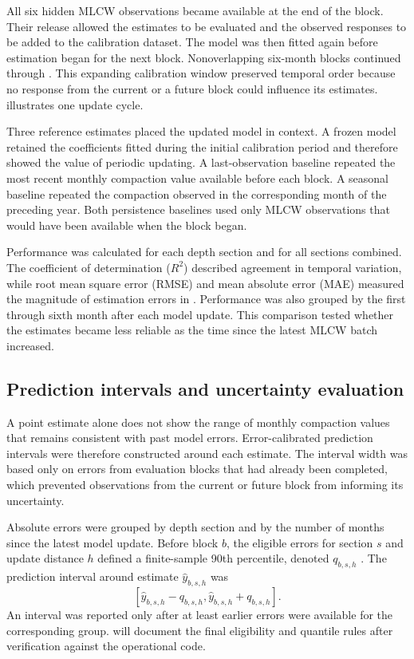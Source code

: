 All six hidden MLCW observations became available at the end of the block. Their release allowed the estimates to be evaluated and the observed responses to be added to the calibration dataset. The model was then fitted again before estimation began for the next block. Nonoverlapping six-month blocks continued through . This expanding calibration window preserved temporal order because no response from the current or a future block could influence its estimates.  illustrates one update cycle.

Three reference estimates placed the updated model in context. A frozen model retained the coefficients fitted during the initial calibration period and therefore showed the value of periodic updating. A last-observation baseline repeated the most recent monthly compaction value available before each block. A seasonal baseline repeated the compaction observed in the corresponding month of the preceding year. Both persistence baselines used only MLCW observations that would have been available when the block began.

Performance was calculated for each depth section and for all sections combined. The coefficient of determination ($R^2$) described agreement in temporal variation, while root mean square error (RMSE) and mean absolute error (MAE) measured the magnitude of estimation errors in . Performance was also grouped by the first through sixth month after each model update. This comparison tested whether the estimates became less reliable as the time since the latest MLCW batch increased.

\subsection{Prediction intervals and uncertainty evaluation}
\label{subsec:uncertainty}

A point estimate alone does not show the range of monthly compaction values that remains consistent with past model errors. Error-calibrated prediction intervals were therefore constructed around each estimate. The interval width was based only on errors from evaluation blocks that had already been completed, which prevented observations from the current or future block from informing its uncertainty.

Absolute errors were grouped by depth section and by the number of months since the latest model update. Before block $b$, the eligible errors for section $s$ and update distance $h$ defined a finite-sample 90th percentile, denoted $q_{b,s,h}$ \citep{angelopoulos_conformal_2023}. The prediction interval around estimate $\widehat{y}_{b,s,h}$ was
\begin{equation}
\left[
\widehat{y}_{b,s,h}-q_{b,s,h},
\widehat{y}_{b,s,h}+q_{b,s,h}
\right].
\label{eq:prediction_interval}
\end{equation}
An interval was reported only after at least  earlier errors were available for the corresponding group.  will document the final eligibility and quantile rules after verification against the operational code.

